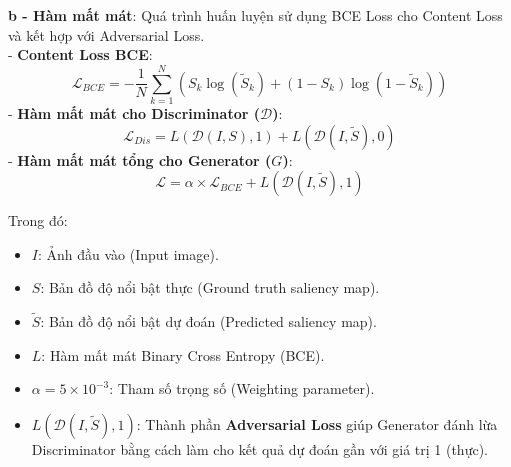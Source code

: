\noindent \textbf{b - Hàm mất mát}: Quá trình huấn luyện sử dụng BCE Loss cho Content Loss và kết hợp với Adversarial Loss.\\
- \textbf{Content Loss BCE}:
\begin{equation}
\mathcal{L}_{BCE}=-\frac{1}{N}\sum_{k=1}^{N}(S_{k}\log(\tilde{S}_{k})+(1-S_{k})\log(1-\tilde{S}_{k}))
\end{equation}
- \textbf{Hàm mất mát cho Discriminator ($\mathcal{D}$)}:
\begin{equation}
\mathcal{L}_{Dis}=L(\mathcal{D}(I,S),1)+L(\mathcal{D}(I,\tilde{S}),0)
\end{equation}
- \textbf{Hàm mất mát tổng cho Generator ($G$)}:
\begin{equation}
\mathcal{L}=\alpha \times \mathcal{L}_{BCE} + L(\mathcal{D}(I,\tilde{S}),1)
\end{equation}

\noindent Trong đó:
\begin{itemize}
    \item $I$: Ảnh đầu vào (Input image).
    \item $S$: Bản đồ độ nổi bật thực (Ground truth saliency map).
    \item $\tilde{S}$: Bản đồ độ nổi bật dự đoán (Predicted saliency map).
    \item $L$: Hàm mất mát Binary Cross Entropy (BCE).
    \item $\alpha = 5\times 10^{-3}$: Tham số trọng số (Weighting parameter).
    \item $L(\mathcal{D}(I,\tilde{S}),1)$: Thành phần \textbf{Adversarial Loss} giúp Generator đánh lừa Discriminator bằng cách làm cho kết quả dự đoán gần với giá trị 1 (thực).
\end{itemize}

